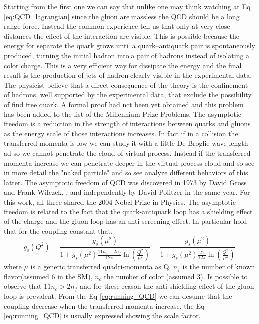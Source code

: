 \documentclass[12pt,a4paper]{book}
\begin{document}
	Starting from the first one we can say that unlike one may think watching at Eq \ref{eq:QCD_lagrangian} since the gluon are massless the QCD should be a long range force. Instead the common experience tell us that only at very close distances the effect of the interaction are visible. This is possible because the energy for separate the quark grows until a quark–antiquark pair is spontaneously produced, turning the initial hadron into a pair of hadrons instead of isolating a color charge. This is a very efficient way for dissipate the energy and the final result is the production of jets of hadron clearly visible in the experimental data. The physicist believe that a direct consequence of the theory is the confinement of hadrons, well supported by the experimental data, that exclude the possibility of find free quark. A formal proof had not been yet obtained and this problem has been added to the list of the Millennium Prize Problems. 	
	The asymptotic freedom is a reduction in the strength of interactions between quarks and gluons as the energy scale of those interactions increases. In fact if in a collision the transferred momenta is low we can study it with a little De Broglie wave length ad so we cannot penetrate the cloud of virtual process. Instead if the transferred momenta increase we can penetrate deeper in the virtual process cloud and so see in more detail the "naked particle" and so see analyze different behaviors of this latter. The asymptotic freedom of QCD was discovered in 1973 by David Gross and Frank Wilczek, \cite{DAVIDPOLITZER1974129}. and independently by David Politzer in the same year. For this work, all three shared the 2004 Nobel Prize in Physics. The asymptotic freedom is related to the fact that the quark-antiquark loop has a shielding effect of the charge and the gluon loop has an anti screening effect.  In particular hold that for the coupling constant that.
	\begin{equation}
		g_s(Q^2)= \frac{g_s(\mu^2)}{1+g_s(\mu^2) \frac{11 n_c- 2n_f}{12\pi} \ln\left(\frac{Q^2}{\mu^2}\right)} = \frac{g_s(\mu^2)}{1+g_s(\mu^2) \frac{21}{12\pi} \ln\left(\frac{Q^2}{\mu^2}\right)}
		\label{eq:running_QCD}
	\end{equation}
	where $\mu$ is a generic transferred quadri-momenta as Q, $n_f$ is the number of known flavor(assumed 6 in the SM), $n_c$ the number of color (assumed 3). Is possible to observe that $11n_c>2n_f$ and for these reason the anti-shielding effect of the gluon loop is prevalent. From the Eq \ref{eq:running_QCD} we can desume that the coupling decrease when the transferred momenta increase. the Eq \ref{eq:running_QCD} is usually expressed showing the scale factor.
\end{document}
